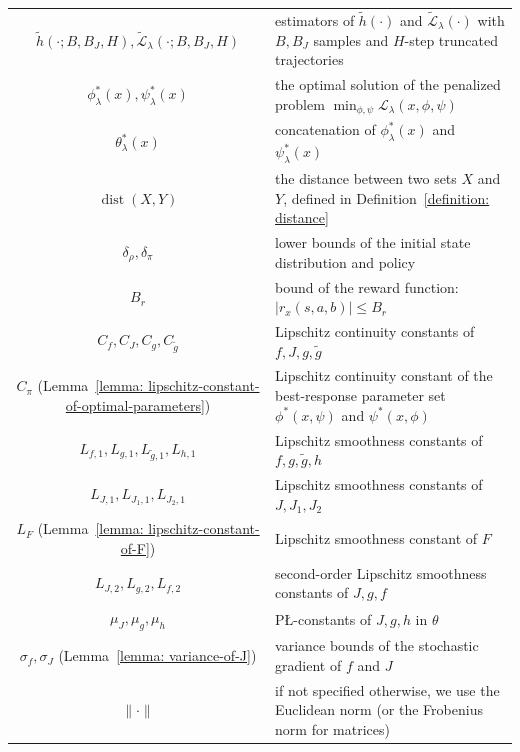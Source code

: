 \documentclass{article}
\theoremstyle{plain}
\theoremstyle{definition}
\theoremstyle{remark}
\DeclareMathOperator{\dist}{dist}
\def\cL{\mathcal L}
\begin{document}
\begin{table}[!htbp]
\begin{center}
\begin{small}
\begin{threeparttable}
\begin{tabular}{cl}
            $\tilde{h}(\cdot;B,B_J,H), \tilde{\cL}_\lambda(\cdot;B,B_J,H)$ & estimators of $\tilde{h}(\cdot)$ and $\tilde{\cL}_\lambda(\cdot)$ with $B,B_J$ samples and $H$-step truncated trajectories \\
            $\phi^*_\lambda(x),\psi^*_\lambda(x)$ & the optimal solution of the penalized problem $\min_{\phi,\psi} \cL_\lambda(x,\phi,\psi)$\\
            $\theta^*_\lambda(x)$ &  concatenation of $\phi^*_\lambda(x)$ and $\psi^*_\lambda(x)$ \\
            $\dist(X,Y)$ & the distance between two sets $X$ and $Y$, defined in Definition~\ref{definition: distance}\\
            $\delta_\rho, \delta_\pi$ & lower bounds of the initial state distribution and policy \\
            $B_r$ & bound of the reward function: $|r_x(s,a,b)| \leq B_r$ \\
            $C_f,C_J, C_g, C_{\widetilde{g}}$ & Lipschitz continuity constants of $f,J,g,\tilde{g}$ \\ 
            $C_\pi$ (Lemma~\ref{lemma: lipschitz-constant-of-optimal-parameters}) & Lipschitz continuity constant of the best-response parameter set $\phi^*(x,\psi)$ and $\psi^*(x,\phi)$\\
            $L_{f,1},L_{g,1},L_{\widetilde{g},1}, L_{h,1}$ & Lipschitz smoothness constants of $f,g,\tilde{g},h$ \\
            $L_{J,1}, L_{J_1,1},L_{J_2,1}$ & Lipschitz smoothness constants of $J,J_1,J_2$ \\
            $L_{F}$ (Lemma~\ref{lemma: lipschitz-constant-of-F}) & Lipschitz smoothness constant of $F$ \\
            $L_{J,2},L_{g,2},L_{f,2}$ & second-order Lipschitz smoothness constants of $J,g,f$ \\
            $\mu_J,\mu_g,\mu_h$ &  P{\L}-constants of $J,g,h$ in $\theta$ \\
            $\sigma_f, \sigma_J$ (Lemma~\ref{lemma: variance-of-J}) & variance bounds of the stochastic gradient of $f$ and $J$ \\
            $\| \cdot \|$ & if not specified otherwise, we use the Euclidean norm (or the Frobenius norm for matrices) \\ 
            \bottomrule
            \end{tabular} 
        \end{threeparttable}
    \end{small}
  \end{center}
  \vskip -0.1in
\end{table}
\end{document}
